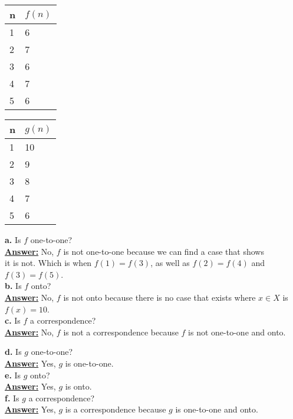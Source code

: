 \documentclass[12pt]{article}
\begin{document}
\begin{center}
\begin{tabular}{l|l}
	n & $f(n)$ \\ \hline
	1 & 6      \\
	2 & 7      \\
	3 & 6      \\
	4 & 7      \\
	5 & 6      \\
\end{tabular}
\quad \quad
\begin{tabular}{l|l}
	n & $g(n)$ \\ \hline
	1 & 10     \\
	2 & 9      \\
	3 & 8      \\
	4 & 7      \\
	5 & 6      \\
\end{tabular}
\end{center}


\textbf{a.} Is $f$ one-to-one? \\
\textbf{\underline{Answer:}} No, $f$ is not one-to-one because we can find a case that shows \\
it is not. Which is when $f(1) = f(3)$, as well as $f(2) = f(4)$ and $f(3) = f(5)$. \\

\textbf{b.} Is $f$ onto? \\
\textbf{\underline{Answer:}} No, $f$ is not onto because there is no case that exists where $x \in X$
is $f(x) = 10$. \\

\textbf{c.} Is $f$ a correspondence? \\
\textbf{\underline{Answer:}} No, $f$ is not a correspondence because $f$ is not one-to-one and onto.

\textbf{d.} Is $g$ one-to-one? \\
\textbf{\underline{Answer:}} Yes, $g$ is one-to-one. \\

\textbf{e.} Is $g$ onto? \\
\textbf{\underline{Answer:}} Yes, $g$ is onto. \\

\textbf{f.} Is $g$ a correspondence? \\
\textbf{\underline{Answer:}} Yes, $g$ is a correspondence because $g$ is one-to-one and onto. \\
\end{document}
